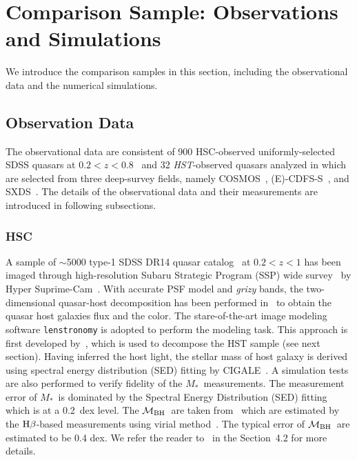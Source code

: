 \documentclass[twocolumn]{aastex631}
\def\smass{{$M_*$}}
\def\hbeta{${\rm H}\beta$}
\def\mbh{$\mathcal M_{\rm BH}$}
\def\hst{{\it HST}}
\begin{document}
\section{Comparison Sample: Observations and Simulations} \label{sec:sample}
We introduce the comparison samples in this section, including the observational data and the numerical simulations.

\subsection{Observation Data}
The observational data are consistent of 900 HSC-observed uniformly-selected SDSS quasars at $0.2<z<0.8$~\citep{Li2021a} and 32 \hst-observed quasars analyzed in \citep[][hereafter D20]{Ding2020} which are selected from three deep-survey fields, namely COSMOS~\citep{Civano2016}, (E)-CDFS-S~\citep{Lehmer2005, Xue2011}, and SXDS~\citep{Ueda2008}. The details of the observational data and their measurements are introduced in following subsections. 

\subsubsection{HSC}\label{sec:hsc}
A sample of $\sim$5000 type-1 SDSS DR14 quasar catalog~\citep{Paris2018} at $0.2<z<1$ has been imaged through high-resolution Subaru Strategic Program (SSP) wide survey~\citep{Aihara2019} by Hyper Suprime-Cam~\citep{Miyazaki2018}. With accurate PSF model and {\it grizy} bands, the two-dimensional quasar-host decomposition has been performed in~\citet[][hereafter L21a]{Li2021a} to obtain the quasar host galaxies flux and the color. The stare-of-the-art image modeling software {\tt lenstronomy}\citep{Birrer2015, Birrer2018, Birrer2021} is adopted to perform the modeling task. This approach is first developed by~\citet{Ding2020}, which is used to decompose the HST sample (see next section). Having inferred the host light, the stellar mass of host galaxy is derived using spectral energy distribution (SED) fitting by CIGALE~\citep{Boquien2019}. A simulation tests are also performed to verify fidelity of the \smass\ measurements. The measurement error of \smass\ is dominated by the Spectral Energy Distribution (SED) fitting which is at a 0.2~dex level. The \mbh\ are taken from~\citet{Rakshit2020} which are estimated by the \hbeta-based measurements using virial method~\citep{Peterson2004, Vestergaard2006}. The typical error of \mbh\ are estimated to be 0.4 dex. We refer the reader to~\citet{Li2021a} in the Section~4.2 for more details.
\end{document}
